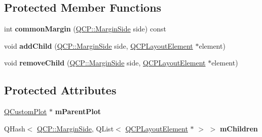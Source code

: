 \subsection*{Protected Member Functions}
\begin{DoxyCompactItemize}
\item 
int {\bfseries common\+Margin} (\hyperlink{namespace_q_c_p_a7e487e3e2ccb62ab7771065bab7cae54}{Q\+C\+P\+::\+Margin\+Side} side) const \hypertarget{class_q_c_p_margin_group_aeaeba9068dba2ef8be41449f0f2582f7}{}\label{class_q_c_p_margin_group_aeaeba9068dba2ef8be41449f0f2582f7}

\item 
void {\bfseries add\+Child} (\hyperlink{namespace_q_c_p_a7e487e3e2ccb62ab7771065bab7cae54}{Q\+C\+P\+::\+Margin\+Side} side, \hyperlink{class_q_c_p_layout_element}{Q\+C\+P\+Layout\+Element} $\ast$element)\hypertarget{class_q_c_p_margin_group_acb9c3a35acec655c2895b7eb95ee0524}{}\label{class_q_c_p_margin_group_acb9c3a35acec655c2895b7eb95ee0524}

\item 
void {\bfseries remove\+Child} (\hyperlink{namespace_q_c_p_a7e487e3e2ccb62ab7771065bab7cae54}{Q\+C\+P\+::\+Margin\+Side} side, \hyperlink{class_q_c_p_layout_element}{Q\+C\+P\+Layout\+Element} $\ast$element)\hypertarget{class_q_c_p_margin_group_a20ab3286062957d99b58db683fe725b0}{}\label{class_q_c_p_margin_group_a20ab3286062957d99b58db683fe725b0}

\end{DoxyCompactItemize}
\subsection*{Protected Attributes}
\begin{DoxyCompactItemize}
\item 
\hyperlink{class_q_custom_plot}{Q\+Custom\+Plot} $\ast$ {\bfseries m\+Parent\+Plot}\hypertarget{class_q_c_p_margin_group_a23cfa29e3cc0f33a59141b77d8c04edf}{}\label{class_q_c_p_margin_group_a23cfa29e3cc0f33a59141b77d8c04edf}

\item 
Q\+Hash$<$ \hyperlink{namespace_q_c_p_a7e487e3e2ccb62ab7771065bab7cae54}{Q\+C\+P\+::\+Margin\+Side}, Q\+List$<$ \hyperlink{class_q_c_p_layout_element}{Q\+C\+P\+Layout\+Element} $\ast$ $>$ $>$ {\bfseries m\+Children}\hypertarget{class_q_c_p_margin_group_a954bc89ff8958b9bb6a4a0d08ed5fc0f}{}\label{class_q_c_p_margin_group_a954bc89ff8958b9bb6a4a0d08ed5fc0f}

\end{DoxyCompactItemize}
